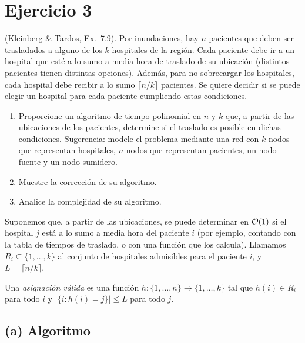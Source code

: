 \section{Ejercicio 3}
\begin{enunciado}
(Kleinberg \& Tardos, Ex.~7.9). Por inundaciones, hay $n$ pacientes que deben ser trasladados a alguno de los $k$ hospitales de la región. Cada paciente debe ir a un hospital que esté a lo sumo a media hora de traslado de su ubicación (distintos pacientes tienen distintas opciones). Además, para no sobrecargar los hospitales, cada hospital debe recibir a lo sumo $\lceil n/k\rceil$ pacientes. Se quiere decidir si se puede elegir un hospital para cada paciente cumpliendo estas condiciones.
\begin{enumerate}[label=(\alph*)]
\item Proporcione un algoritmo de tiempo polinomial en $n$ y $k$ que, a partir de las ubicaciones de los pacientes, determine si el traslado es posible en dichas condiciones. Sugerencia: modele el problema mediante una red con $k$ nodos que representan hospitales, $n$ nodos que representan pacientes, un nodo fuente y un nodo sumidero.
\item Muestre la corrección de su algoritmo.
\item Analice la complejidad de su algoritmo.
\end{enumerate}
\end{enunciado}


Suponemos que, a partir de las ubicaciones, se puede determinar en $\mathcal{O}(1)$ si el hospital $j$ está a lo sumo a media hora del paciente $i$ (por ejemplo, contando con la tabla de tiempos de traslado, o con una función que los calcula). Llamamos $R_i\subseteq\{1,\dots,k\}$ al conjunto de hospitales admisibles para el paciente $i$, y $L=\lceil n/k\rceil$.

Una \emph{asignación válida} es una función $h:\{1,\dots,n\}\to\{1,\dots,k\}$ tal que $h(i)\in R_i$ para todo $i$ y $|\{i : h(i)=j\}|\le L$ para todo $j$.

\subsection*{(a) Algoritmo}

